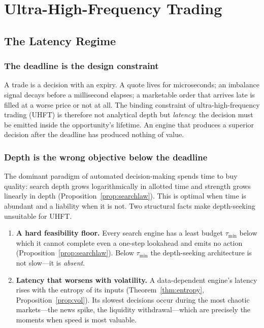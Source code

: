 \documentclass[11pt,oneside]{book}
\theoremstyle{definition}
\theoremstyle{plain}
\theoremstyle{remark}
\newcommand{\budget}{\tau}
\begin{document}
\part{Ultra-High-Frequency Trading}

\chapter{The Latency Regime}\label{ch:regime}

\section{The deadline is the design constraint}
A trade is a decision with an expiry. A quote lives for microseconds; an imbalance signal
decays before a millisecond elapses; a marketable order that arrives late is filled at a
worse price or not at all. The binding constraint of ultra-high-frequency trading (UHFT)
is therefore not analytical depth but \emph{latency}: the decision must be emitted inside
the opportunity's lifetime. An engine that produces a superior decision after the deadline
has produced nothing of value.

\section{Depth is the wrong objective below the deadline}
The dominant paradigm of automated decision-making spends time to buy quality: search
depth grows logarithmically in allotted time and strength grows linearly in depth
(Proposition~\ref{prop:searchlaw}). This is optimal when time is abundant and a liability
when it is not. Two structural facts make depth-seeking unsuitable for UHFT.

\begin{enumerate}[leftmargin=2em]
  \item \textbf{A hard feasibility floor.} Every search engine has a least budget
        $\budget_{\min}$ below which it cannot complete even a one-step lookahead and emits
        no action (Proposition~\ref{prop:searchlaw}). Below $\budget_{\min}$ the
        depth-seeking architecture is not slow---it is \emph{absent}.
  \item \textbf{Latency that worsens with volatility.} A data-dependent engine's latency
        rises with the entropy of its inputs (Theorem~\ref{thm:entropy},
        Proposition~\ref{prop:vol}). Its slowest decisions occur during the most chaotic
        markets---the news spike, the liquidity withdrawal---which are precisely the
        moments when speed is most valuable.
\end{enumerate}
\end{document}
